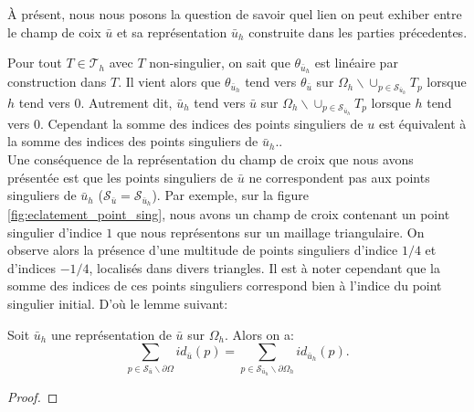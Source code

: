 À présent, nous nous posons la question de savoir quel lien on peut exhiber entre le champ de coix $\bar{u}$ et sa représentation $\bar{u}_h$ construite dans les parties précedentes.

Pour tout $T\in\mathcal{T}_h$ avec $T$ non-singulier, on sait que $\theta_{\bar{u}_h}$ est linéaire par construction dans $T$. Il vient alors que $\theta_{\bar{u}_h}$ tend vers $\theta_{\bar{u}}$ sur $\Omega_h\backslash\cup_{p\in\mathcal{S}_{\bar{u}_h}}T_p$ lorsque $h$ tend vers $0$. Autrement dit, $\bar{u}_h$ tend vers $\bar{u}$ sur $\Omega_h\backslash\cup_{p\in\mathcal{S}_{\bar{u}_h}}T_p$ lorsque $h$ tend vers $0$. \color{red} Cependant la somme des indices des points singuliers de $u$ est équivalent à la somme des indices des points singuliers de $\bar{u}_h$.\color{black}.
\[\]
Une conséquence de la représentation du champ de croix que nous avons présentée est que les points singuliers de $\bar{u}$ ne correspondent pas aux points singuliers de $\bar{u}_h$ ($\mathcal{S}_{\bar{u}}=\mathcal{S}_{\bar{u}_h}$). Par exemple, sur la figure \ref{fig:eclatement_point_sing}, nous avons un champ de croix contenant un point singulier d'indice $1$ que nous représentons sur un maillage triangulaire. On observe alors la présence d'une multitude de points singuliers d'indice $1/4$ et d'indices $-1/4$, localisés dans divers triangles. Il est à noter cependant que la somme des indices de ces points singuliers correspond bien à l'indice du point singulier initial. D'où le lemme suivant:

\begin{lemma}
 Soit $\bar{u}_h$ une représentation de $\bar{u}$ sur $\Omega_h$. Alors on a:
 $$
 \sum_{p\in\mathcal{S}_{\bar{u}}\backslash\partial\Omega}id_{\bar{u}}(p)=\sum_{p\in\mathcal{S}_{\bar{u}_h}\backslash\partial\Omega_h}id_{\bar{u}_h}(p).
 $$
\end{lemma}

\begin{proof}

\end{proof}


